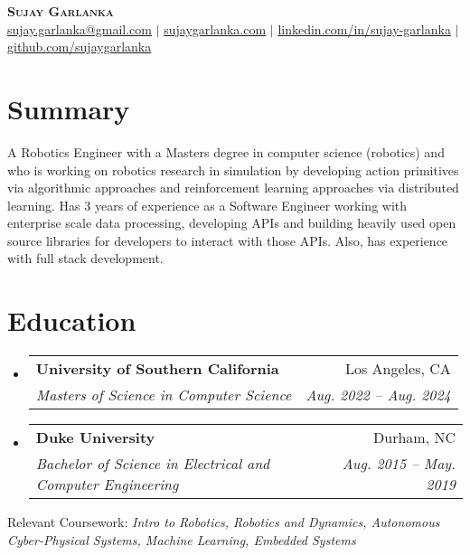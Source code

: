 \documentclass[letterpaper,10pt]{article}
\makeatletter
\newcommand{\resumeSubheading}[4]{
  \vspace{-2pt}\item
    \begin{tabular*}{0.97\textwidth}[t]{l@{\extracolsep{\fill}}r}
      \textbf{#1} & #2 \\
      \textit{\small#3} & \textit{\small #4} \\
    \end{tabular*}\vspace{-7pt}
}
\newcommand{\resumeSubHeadingListStart}{\begin{itemize}[leftmargin=0.15in, label={}]}
\newcommand{\resumeSubHeadingListEnd}{\end{itemize}}
\makeatother
\begin{document}

\begin{center}
    \textbf{\Huge \scshape Sujay Garlanka} \\ \vspace{1pt}
    \href{mailto:x@x.com}
    {\small \underline{sujay.garlanka@gmail.com}} $|$ 
    \href{https://www.sujaygarlanka.com}
    {\small \underline{sujaygarlanka.com}} $|$
    \href{https://www.linkedin.com/in/sujay-garlanka/}
    {\small \underline{linkedin.com/in/sujay-garlanka}} $|$
    \href{https://github.com/sujaygarlanka}
    {\small \underline{github.com/sujaygarlanka}}
\end{center}

\section{Summary}
    \small A Robotics Engineer with a Masters degree in computer science (robotics) and who is working on robotics research in simulation by developing action primitives via algorithmic approaches and reinforcement learning approaches via distributed learning. Has 3 years of experience as a Software Engineer working with enterprise scale data processing, developing APIs and building heavily used open source libraries for developers to interact with those APIs. Also, has experience with full stack development. 

\section{Education}
  \resumeSubHeadingListStart
    \resumeSubheading
      {University of Southern California}{Los Angeles, CA}
      {Masters of Science in Computer Science}{Aug. 2022 -- Aug. 2024}
    \resumeSubheading
      {Duke University}{Durham, NC}
      {Bachelor of Science in Electrical and Computer Engineering}{Aug. 2015 -- May. 2019}
  \resumeSubHeadingListEnd
  Relevant Coursework: \emph{Intro to Robotics, Robotics and Dynamics, Autonomous Cyber-Physical Systems, Machine Learning, Embedded Systems}
\end{document}
